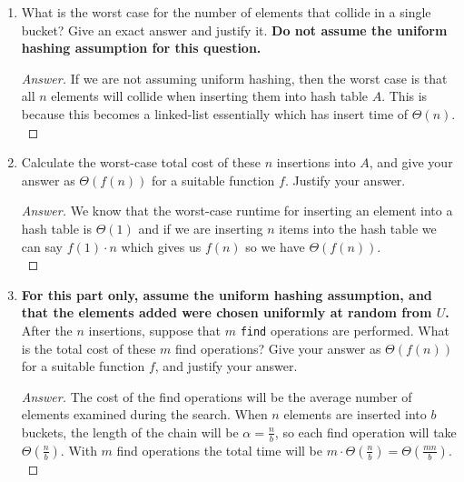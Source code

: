 \documentclass[11pt]{article}
\theoremstyle{definition}
\theoremstyle{definition}
\theoremstyle{definition}
\begin{document}
	\begin{enumerate}[label=(\alph*)]
	  \item What is the worst case for the number of elements that collide in a single bucket? Give an exact answer and justify it.     \textbf{Do not assume the uniform hashing assumption for this question.}

    \begin{proof}[Answer]
     If we are not assuming uniform hashing, then the worst case is that all $n$ elements will collide when inserting them into hash table $A$. This is because this becomes a linked-list essentially which has insert time of $\Theta(n)$.\\
     
    \end{proof}

\vfill
	  \item Calculate the worst-case total cost of these $n$ insertions into $A$, and give your answer as $\Theta(f(n))$ for a suitable function $f$. Justify your answer.

    \begin{proof}[Answer]
       We know that the worst-case runtime for inserting an element into a hash table is $\Theta(1)$ and if we are inserting $n$ items into the hash table we can say $f(1) \cdot n$ which gives us $f(n)$ so we have $\Theta(f(n))$.\\
        
    \end{proof}
    
    \vfill
	
	\item \textbf{For this part only, assume the uniform hashing assumption, and that the elements added were chosen uniformly at random from $U$.} After the $n$ insertions, suppose that $m$ \texttt{find} operations are performed. What is the total cost of these $m$ find operations? Give your answer as $\Theta(f(n))$ for a suitable function $f$, and justify your answer.
    \begin{proof}[Answer]
        The cost of the find operations will be the average number of elements examined during the search. When $n$ elements are inserted into $b$ buckets, the length of the chain will be $\alpha = \frac{n}{b}$, so each find operation will take $\Theta(\frac{n}{b})$. With $m$ find operations the total time will be $m \cdot \Theta(\frac{n}{b}) = \Theta(\frac{mn}{b})$.\\
        
        
    \end{proof}

\vfill
	\end{enumerate} 
\end{document}
